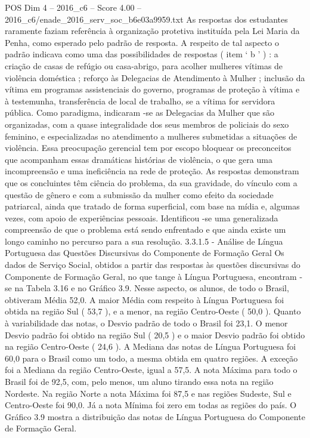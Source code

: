 \begin{textsample}{POS Dim 4 – 2016\_c6 – Score 4.00 – 2016\_c6/enade\_2016\_serv\_soc\_b6e03a9959.txt}
As respostas dos estudantes raramente faziam referência à organização protetiva instituída pela Lei Maria da Penha, como esperado pelo padrão de resposta.
A respeito de tal aspecto o padrão indicava como uma das possibilidades de respostas ( item ‘ b ’ ) : a criação de casas de refúgio ou casa-abrigo, para acolher mulheres vítimas de violência doméstica ; reforço às Delegacias de Atendimento à Mulher ; inclusão da vítima em programas assistenciais do governo, programas de proteção à vítima e à testemunha, transferência de local de trabalho, se a vítima for servidora pública.
Como paradigma, indicaram -se as Delegacias da Mulher que são organizadas, com a quase integralidade dos seus membros de policiais do sexo feminino, e especializadas no atendimento a mulheres submetidas a situações de violência.
Essa preocupação gerencial tem por escopo bloquear os preconceitos que acompanham essas dramáticas histórias de violência, o que gera uma incompreensão e uma ineficiência na rede de proteção.
As respostas demonstram que os concluintes têm ciência do problema, da sua gravidade, do vínculo com a questão de gênero e com a submissão da mulher como efeito da sociedade patriarcal, ainda que tratado de forma superficial, com base na mídia e, algumas vezes, com apoio de experiências pessoais.
Identificou -se uma generalizada compreensão de que o problema está sendo enfrentado e que ainda existe um longo caminho no percurso para a sua resolução. 3.3.1.5 - Análise de Língua Portuguesa das Questões Discursivas do Componente de Formação Geral Os dados de Serviço Social, obtidos a partir das respostas às questões discursivas do Componente de Formação Geral, no que tange à Língua Portuguesa, encontram -se na Tabela 3.16 e no Gráfico 3.9.
Nesse aspecto, os alunos, de todo o Brasil, obtiveram Média 52,0.
A maior Média com respeito à Língua Portuguesa foi obtida na região Sul ( 53,7 ), e a menor, na região Centro-Oeste ( 50,0 ).
Quanto à variabilidade das notas, o Desvio padrão de todo o Brasil foi 23,1.
O menor Desvio padrão foi obtido na região Sul ( 20,5 ) e o maior Desvio padrão foi obtido na região Centro-Oeste ( 24,6 ).
A Mediana das notas de Língua Portuguesa foi 60,0 para o Brasil como um todo, a mesma obtida em quatro regiões.
A exceção foi a Mediana da região Centro-Oeste, igual a 57,5.
A nota Máxima para todo o Brasil foi de 92,5, com, pelo menos, um aluno tirando essa nota na região Nordeste.
Na região Norte a nota Máxima foi 87,5 e nas regiões Sudeste, Sul e Centro-Oeste foi 90,0.
Já a nota Mínima foi zero em todas as regiões do país.
O Gráfico 3.9 mostra a distribuição das notas de Língua Portuguesa do Componente de Formação Geral.

\end{textsample}
